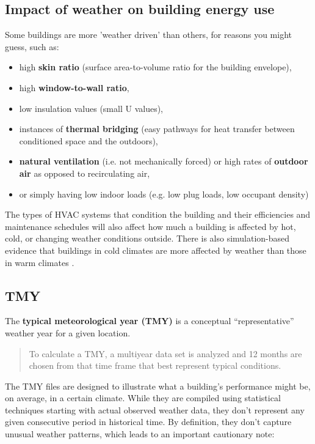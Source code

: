 \documentclass[10pt]{article}
\begin{document}
\subsection{Impact of weather on building energy use}

Some buildings are more 'weather driven' than others, for reasons you might guess, such as: 
\begin{itemize}
    \item high \textbf{skin ratio} (surface area-to-volume ratio for the building envelope),
    \item high \textbf{window-to-wall ratio},
    \item low insulation values (small U values),
    \item instances of \textbf{thermal bridging} (easy pathways for heat transfer between conditioned space and the outdoors),
    \item \textbf{natural ventilation} (i.e. not mechanically forced) or high rates of \textbf{outdoor air} as opposed to recirculating air,
    \item or simply having low indoor loads (e.g. low plug loads, low occupant density)
\end{itemize}

The types of HVAC systems that condition the building and their efficiencies and maintenance schedules will also affect how much a building is affected by hot, cold, or changing weather conditions outside. There is also simulation-based evidence that buildings in cold climates are more affected by weather than those in warm climates \cite{Hong2013-ti}.

\subsection{TMY}

The \textbf{typical meteorological year (TMY)} is a conceptual ``representative'' weather year for a given location. 

\begin{quote}
To calculate a TMY, a multiyear data set is analyzed and 12 months are chosen from that time frame that best represent typical conditions. \cite{tmy-nsrdb}
\end{quote}

The TMY files are designed to illustrate what a building's performance might be, on average, in a certain climate. While they are compiled using statistical techniques starting with actual observed weather data, they don't represent any given consecutive period in historical time. By definition, they don't capture unusual weather patterns, which leads to an important cautionary note:
\end{document}
